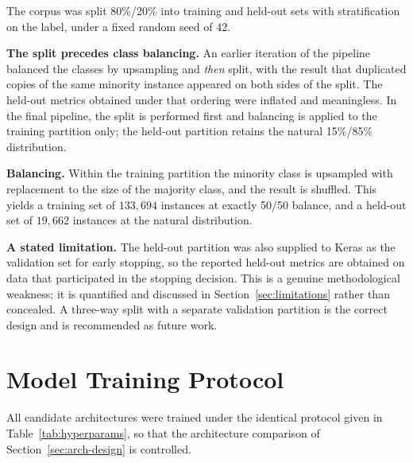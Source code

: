 The corpus was split 80\%/20\% into training and held-out sets with
stratification on the label, under a fixed random seed of 42.

\textbf{The split precedes class balancing.} An earlier iteration of the
pipeline balanced the classes by upsampling and \emph{then} split, with the
result that duplicated copies of the same minority instance appeared on both
sides of the split. The held-out metrics obtained under that ordering were
inflated and meaningless. In the final pipeline, the split is performed first
and balancing is applied to the training partition only; the held-out partition
retains the natural 15\%/85\% distribution.

\textbf{Balancing.} Within the training partition the minority class is
upsampled with replacement to the size of the majority class, and the result is
shuffled. This yields a training set of $133{,}694$ instances at exactly 50/50
balance, and a held-out set of $19{,}662$ instances at the natural distribution.

\textbf{A stated limitation.} The held-out partition was also supplied to Keras
as the validation set for early stopping, so the reported held-out metrics are
obtained on data that participated in the stopping decision. This is a genuine
methodological weakness; it is quantified and discussed in
Section~\ref{sec:limitations} rather than concealed. A three-way split with a
separate validation partition is the correct design and is recommended as
future work.

\section{Model Training Protocol}
\label{sec:training-protocol}

All candidate architectures were trained under the identical protocol given in
Table~\ref{tab:hyperparams}, so that the architecture comparison of
Section~\ref{sec:arch-design} is controlled.

